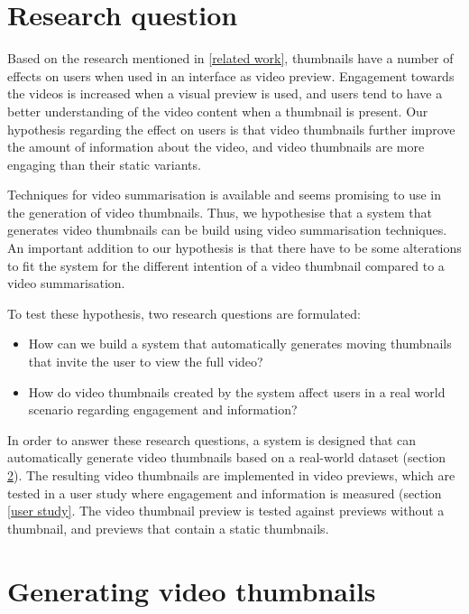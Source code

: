 \documentclass{../resources/sig-alternate-05-2015}
\begin{document}
\section{Research question}

Based on the research mentioned in \ref{related work}, thumbnails have a number of effects on users when used in an interface as video preview. Engagement towards the videos is increased when a visual preview is used, and users tend to have a better understanding of the video content when a thumbnail is present. Our hypothesis regarding the effect on users is that video thumbnails further improve the amount of information about the video, and video thumbnails are more engaging than their static variants.

Techniques for video summarisation is available and seems promising to use in the generation of video thumbnails. Thus, we hypothesise that a system that generates video thumbnails can be build using video summarisation techniques. An important addition to our hypothesis is that there have to be some alterations to fit the system for the different intention of a video thumbnail compared to a video summarisation.

To test these hypothesis, two research questions are formulated:

\begin{itemize}
	\item How can we build a system that automatically generates moving thumbnails that invite the user to view the full video?
	\item How do video thumbnails created by the system affect users in a real world scenario regarding engagement and information?
\end{itemize}

In order to answer these research questions, a system is designed that can automatically generate video thumbnails based on a real-world dataset (section \ref{system description}). The resulting video thumbnails are implemented in video previews, which are tested in a user study where engagement and information is measured (section \ref{user study}. The video thumbnail preview is tested against previews without a thumbnail, and previews that contain a static thumbnails.


\section{Generating video thumbnails}
\label{system description}
\end{document}
